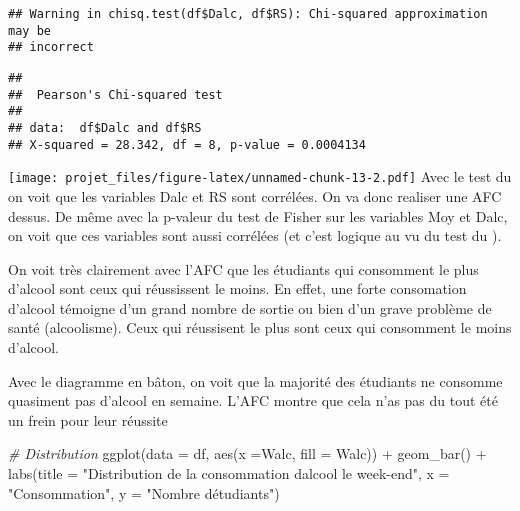 \documentclass[
]{article}
\newenvironment{Shaded}{\begin{snugshade}}{\end{snugshade}}
\newcommand{\AttributeTok}[1]{\textcolor[rgb]{0.77,0.63,0.00}{#1}}
\newcommand{\CommentTok}[1]{\textcolor[rgb]{0.56,0.35,0.01}{\textit{#1}}}
\newcommand{\FunctionTok}[1]{\textcolor[rgb]{0.00,0.00,0.00}{#1}}
\newcommand{\NormalTok}[1]{#1}
\newcommand{\OtherTok}[1]{\textcolor[rgb]{0.56,0.35,0.01}{#1}}
\newcommand{\SpecialCharTok}[1]{\textcolor[rgb]{0.00,0.00,0.00}{#1}}
\newcommand{\StringTok}[1]{\textcolor[rgb]{0.31,0.60,0.02}{#1}}
\begin{document}
\begin{verbatim}
## Warning in chisq.test(df$Dalc, df$RS): Chi-squared approximation may be
## incorrect
\end{verbatim}

\begin{verbatim}
## 
##  Pearson's Chi-squared test
## 
## data:  df$Dalc and df$RS
## X-squared = 28.342, df = 8, p-value = 0.0004134
\end{verbatim}

\begin{Shaded}
\end{Shaded}

\texttt{[image: projet\_files/figure-latex/unnamed-chunk-13-2.pdf]} Avec
le test du  on voit que les variables Dalc et RS sont corrélées.
On va donc realiser une AFC dessus. De même avec la p-valeur du test de
Fisher sur les variables Moy et Dalc, on voit que ces variables sont
aussi corrélées (et c'est logique au vu du test du ).

On voit très clairement avec l'AFC que les étudiants qui consomment le
plus d'alcool sont ceux qui réussissent le moins. En effet, une forte
consomation d'alcool témoigne d'un grand nombre de sortie ou bien d'un
grave problème de santé (alcoolisme). Ceux qui réussisent le plus sont
ceux qui consomment le moins d'alcool.

Avec le diagramme en bâton, on voit que la majorité des étudiants ne
consomme quasiment pas d'alcool en semaine. L'AFC montre que cela n'as
pas du tout été un frein pour leur réussite

\begin{Shaded}
\begin{Highlighting}[]
\CommentTok{\# Distribution}
\FunctionTok{ggplot}\NormalTok{(}\AttributeTok{data =}\NormalTok{ df, }\FunctionTok{aes}\NormalTok{(}\AttributeTok{x =}\NormalTok{Walc, }\AttributeTok{fill =}\NormalTok{ Walc)) }\SpecialCharTok{+}
  \FunctionTok{geom\_bar}\NormalTok{() }\SpecialCharTok{+}
  \FunctionTok{labs}\NormalTok{(}\AttributeTok{title =} \StringTok{"Distribution de la consommation d\textquotesingle{}alcool le week{-}end"}\NormalTok{,}
       \AttributeTok{x =} \StringTok{"Consommation"}\NormalTok{, }\AttributeTok{y =} \StringTok{"Nombre d\textquotesingle{}étudiants"}\NormalTok{) }
\end{Highlighting}
\end{Shaded}
\end{document}
